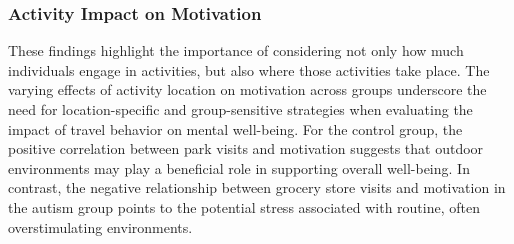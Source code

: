 \documentclass[
  letterpaper,
  number,
  review,
  3p]{elsarticle}
\begin{document}
\begin{table}

\caption{\label{tbl-groupFEGrocery}FE Models: Motivation and Number of
Activities at Grocery Stores by Group}


\end{table}%

\subsubsection{Activity Impact on
Motivation}\label{activity-impact-on-motivation}

These findings highlight the importance of considering not only how much
individuals engage in activities, but also where those activities take
place. The varying effects of activity location on motivation across
groups underscore the need for location-specific and group-sensitive
strategies when evaluating the impact of travel behavior on mental
well-being. For the control group, the positive correlation between park
visits and motivation suggests that outdoor environments may play a
beneficial role in supporting overall well-being. In contrast, the
negative relationship between grocery store visits and motivation in the
autism group points to the potential stress associated with routine,
often overstimulating environments.
\end{document}
